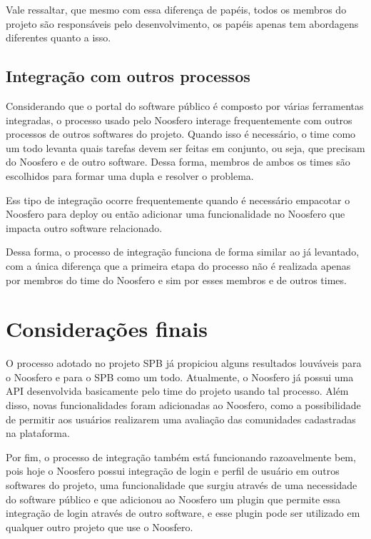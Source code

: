 \documentclass[a4paper, 11pt]{article}
\begin{document}
Vale ressaltar, que mesmo com essa diferença de papéis, todos os membros do
projeto são responsáveis pelo desenvolvimento, os papéis apenas tem abordagens
diferentes quanto a isso.


\subsection*{Integração com outros processos}

Considerando que o portal do software público é composto por várias
ferramentas integradas, o processo usado pelo Noosfero interage frequentemente
com outros processos de outros softwares do projeto. Quando isso é necessário,
o time como um todo levanta quais tarefas devem ser feitas em conjunto, ou
seja, que precisam do Noosfero e de outro software. Dessa forma, membros de
ambos os times são escolhidos para formar uma dupla e resolver o problema.

Ess tipo de integração ocorre frequentemente quando é necessário empacotar o
Noosfero para deploy ou então adicionar uma funcionalidade no Noosfero que
impacta outro software relacionado.

Dessa forma, o processo de integração funciona de forma similar ao já
levantado, com a única diferença que a primeira etapa do processo não é
realizada apenas por membros do time do Noosfero e sim por esses membros e de
outros times.

\section*{Considerações finais}

O processo adotado no projeto SPB já propiciou alguns resultados louváveis
para o Noosfero e para o SPB como um todo. Atualmente, o Noosfero já possui
uma API desenvolvida basicamente pelo time do projeto usando tal processo.
Além disso, novas funcionalidades foram adicionadas ao Noosfero, como a
possibilidade de permitir aos usuários realizarem uma avaliação das
comunidades cadastradas na plataforma.

Por fim, o processo de integração também está funcionando razoavelmente bem,
pois hoje o Noosfero possui integração de login e perfil de usuário em outros
softwares do projeto, uma funcionalidade que surgiu através de uma necessidade
do software público e que adicionou ao Noosfero um plugin que permite essa
integração de login através de outro software, e esse plugin pode ser
utilizado em qualquer outro projeto que use o Noosfero.
\end{document}
